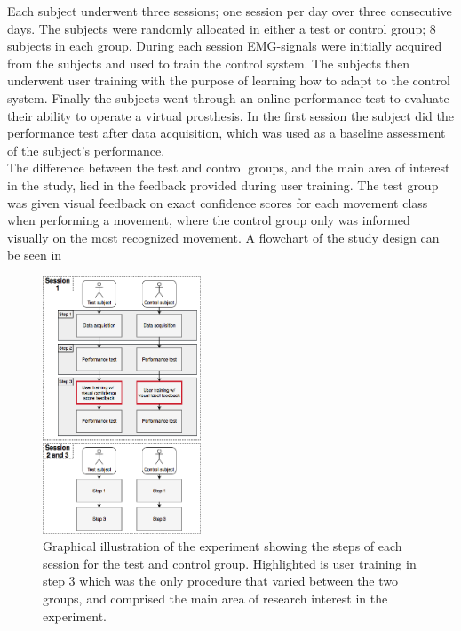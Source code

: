 Each subject underwent three sessions; one session per day over three consecutive days. The subjects were randomly allocated in either a test or control group; 8 subjects in each group. During each session EMG-signals were initially acquired from the subjects and used to train the control system. The subjects then underwent user training with the purpose of learning how to adapt to the control system. Finally the subjects went through an online performance test to evaluate their ability to operate a virtual prosthesis. In the first session the subject did the performance test after data acquisition, which was used as a baseline assessment of the subject's performance. \\
The difference between the test and control groups, and the main area of interest in the study, lied in the feedback provided during user training. The test group was given visual feedback on exact confidence scores for each movement class when performing a movement, where the control group only was informed visually on the most recognized movement. A flowchart of the study design can be seen in 


\begin{figure}[H]                                         
	\includegraphics[width=0.42\textwidth]{figures/Paper/Study_design}  
	\caption{Graphical illustration of the experiment showing the steps of each session for the test and control group. Highlighted is user training in step 3 which was the only procedure that varied between the two groups, and comprised the main area of research interest in the experiment.}
	\label{fig:P:std} 
\end{figure}